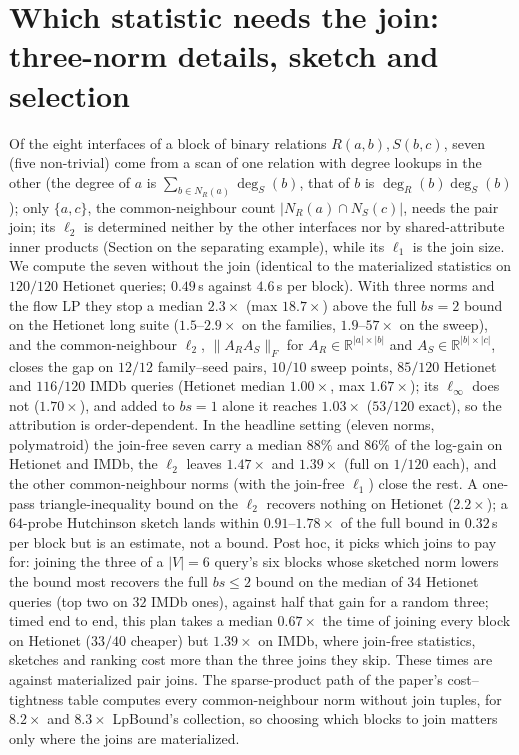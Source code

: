\documentclass[11pt]{article}
\begin{document}
\section{Which statistic needs the join: three-norm details, sketch and selection}
Of the eight interfaces of a block of binary relations $R(a,b),S(b,c)$,
seven (five non-trivial) come from a scan of one relation with degree lookups in the other
(the degree of $a$ is $\sum_{b\in N_R(a)}\deg_S(b)$, that of $b$ is
$\deg_R(b)\deg_S(b)$); only $\{a,c\}$, the common-neighbour count
$|N_R(a)\cap N_S(c)|$, needs the pair join; its $\ell_2$ is determined neither by the other interfaces nor by shared-attribute inner products (Section on the separating example), while its $\ell_1$ is the join size. We compute the seven without the join (identical to
the materialized statistics on $120/120$ Hetionet queries; $0.49$\,s
against $4.6$\,s per block). With three norms and the flow LP they stop a
median $2.3\times$ (max $18.7\times$) above the full $bs{=}2$ bound on the
Hetionet long suite ($1.5$--$2.9\times$ on the families, $1.9$--$57\times$
on the sweep), and the common-neighbour $\ell_2$, $\|A_RA_S\|_F$ for $A_R\in\mathbb{R}^{|a|\times|b|}$ and $A_S\in\mathbb{R}^{|b|\times|c|}$,
closes the gap on $12/12$ family--seed pairs, $10/10$ sweep points,
$85/120$ Hetionet and $116/120$ IMDb queries (Hetionet median
$1.00\times$, max $1.67\times$); its $\ell_\infty$ does not ($1.70\times$),
and added to $bs{=}1$ alone it reaches $1.03\times$ ($53/120$ exact), so
the attribution is order-dependent. In the headline setting (eleven norms,
polymatroid) the join-free seven carry a median $88\%$ and $86\%$ of the
log-gain on Hetionet and IMDb, the $\ell_2$ leaves $1.47\times$ and
$1.39\times$ (full on $1/120$ each), and the other common-neighbour norms (with the join-free $\ell_1$) close the rest. A one-pass triangle-inequality bound on the $\ell_2$
recovers nothing on Hetionet ($2.2\times$); a $64$-probe Hutchinson sketch
lands within $0.91$--$1.78\times$ of the full bound in $0.32$\,s per block
but is an estimate, not a bound. Post hoc, it picks which joins to pay
for: joining the three of a $|V|{=}6$ query's six blocks whose sketched
norm lowers the bound most recovers the full $bs{\le}2$ bound on the median
of $34$ Hetionet queries (top two on $32$ IMDb ones), against half that
gain for a random three; timed end to end, this plan takes a median
$0.67\times$ the time of joining every block on Hetionet ($33/40$ cheaper)
but $1.39\times$ on IMDb, where join-free statistics, sketches and ranking
cost more than the three joins they skip.
These times are against materialized pair joins. The sparse-product path
of the paper's cost--tightness table computes every common-neighbour norm without join
tuples, for $8.2\times$ and $8.3\times$ LpBound's collection, so choosing
which blocks to join matters only where the joins are materialized.
\end{document}
